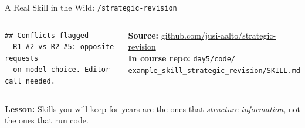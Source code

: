 \documentclass[aspectratio=169,10pt]{beamer}
\begin{document}
\begin{frame}[fragile]{A Real Skill in the Wild: \texttt{/strategic-revision}}
\begin{columns}[T]
\begin{lstlisting}[basicstyle=\tiny\ttfamily, frame=single]
## Conflicts flagged
- R1 #2 vs R2 #5: opposite requests
  on model choice. Editor call needed.
\end{lstlisting}

\vspace{0.2em}
\textbf{Source:} \href{https://github.com/jusi-aalto/strategic-revision}{github.com/jusi-aalto/strategic-revision}\\
\textbf{In course repo:} \texttt{day5/code/}\\
\phantom{xx}\texttt{example\_skill\_strategic\_revision/SKILL.md}
\end{columns}

\vspace{0.2em}
\textbf{Lesson:} Skills you will keep for years are the ones that
\emph{structure information}, not the ones that run code.
\end{frame}
\end{document}
